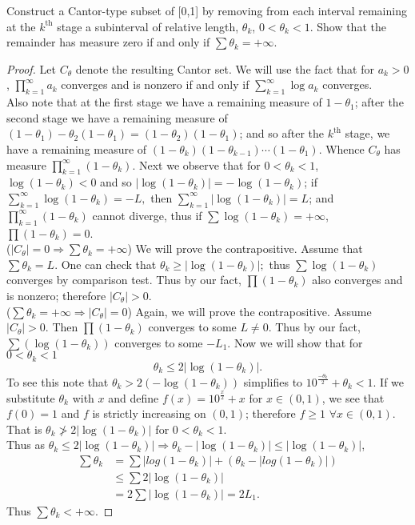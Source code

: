 \documentclass[12pt]{book}
\renewcommand{\implies}{\Rightarrow}
\renewcommand{\.}{\mkern1mu}
\newcommand{\abs}[1]{\left| #1 \right|}
\theoremstyle{theorem}
\begin{document}
\item Construct a Cantor-type subset of [0,1] by removing from each interval remaining at the $k^\text{th}$ stage a subinterval of relative length, $\theta_k$, $0< \theta_k < 1.$ Show that the remainder has measure zero if and only if $\sum \theta_k = +\infty$. 
	\begin{proof}
	Let $C_\theta$ denote the resulting Cantor set. We will use the fact that for $a_k >0$, $\prod_{k=1}^\infty a_k$ converges and is nonzero if and only if $\sum_{k=1}^\infty\log{a_k}$ converges.\\
	
	Also note that at the first stage we have a remaining measure of $1-\theta_1$; after the second stage we have a remaining measure of $(1-\theta_1) - \theta_2(1 - \theta_1) = (1-\theta_2)(1-\theta_1)$; and so after the $k^\text{th}$ stage, we have a remaining measure of $(1-\theta_k)(1-\theta_{k-1})\cdots(1-\theta_1)$. Whence $C_\theta$ has measure $\prod_{k=1}^\infty(1-\theta_k)$. Next we observe that for $0 < \theta_k < 1$, $\log(1-\theta_k) < 0$ and so $\abs{\log(1-\theta_k)} = -\log(1-\theta_k)$; if $\sum_{k=1}^\infty \log(1-\theta_k) = -L,$ then $\sum_{k=1}^\infty \abs{\log(1-\theta_k)} = L$; and $\prod_{k=1}^\infty (1-\theta_k)$ cannot diverge, thus if $\sum\log(1-\theta_k) = +\infty$, $\prod(1-\theta_k) = 0$.\\
	
	($\abs{C_\theta} = 0 \implies \sum\theta_k = +\infty$) We will prove the contrapositive. Assume that $\sum\theta_k = L$. One can check that $\theta_k \geq \abs{\log(1-\theta_k)};$ thus $\sum\log(1-\theta_k)$ converges by comparison test. Thus by our fact, $\prod(1-\theta_k)$ also converges and is nonzero; therefore $\abs{C_\theta} > 0$.\\
	
	($\sum\theta_k = +\infty \implies \abs{C_\theta} = 0$) Again, we will prove the contrapositive. Assume $\abs{C_\theta}>0$. Then $\prod(1-\theta_k)$ converges to some $L \neq 0$. Thus by our fact, $\sum (\log(1-\theta_k))$ converges to some $-L_1$. Now we will show that for $0<\theta_k<1$ 
		\[ \theta_k \leq 2\abs{\log(1-\theta_k)}.\]
	To see this note that $\theta_k > 2(-\log(1-\theta_k))$ simplifies to $10^{\frac{-\theta_k}{2}} + \theta_k < 1$. If we substitute $\theta_k$ with $x$ and define $f(x) = 10^{\frac{x}{2}} + x$ for $x \in (0,1)$, we see that  $f(0) = 1$ and $f$ is strictly increasing on $(0,1)$; therefore $f \geq 1$ $\forall x \in (0,1)$. That is $\theta_k \not> 2\abs{\log(1-\theta_k)}$ for $0<\theta_k<1$.\\
	
	Thus as $\theta_k \leq 2\abs{\log(1-\theta_k)} \implies \theta_k - \abs{\log(1-\theta_k)} \leq \abs{\log(1-\theta_k)}$, 
		\begin{align*}
		\sum \theta_k &= \sum \abs{log(1-\theta_k)} + (\theta_k - \abs{log(1-\theta_k)})\\
			&\leq \sum 2\abs{\log(1-\theta_k)}\\
			&=  2\sum\abs{\log(1-\theta_k)} = 2L_1. 
		\end{align*}
	Thus $\sum \theta_k < +\infty$.
	\end{proof}
\end{document}
